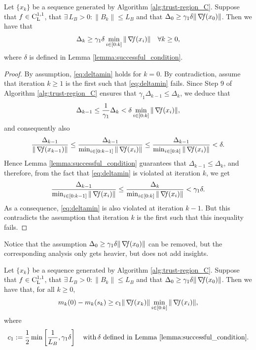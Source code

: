 \documentclass[10pt,a4paper]{article}
\begin{document}
\begin{lemma}\label{lemma:deltamin}
	Let $\{x_k\}$ be a sequence generated by Algorithm \ref{alg:trust-region_C}. Suppose that $f\in \mathord{\mathrm{C^{1,1}_{L}}}$, that $\exists\, L_B>0: \|B_k\| \leq L_B$ and that $\Delta_0\geq \gamma_1 \delta \|\operatorname*{\mathit{\nabla \!f}}(x_0)\|$. Then we have that
	\begin{equation}\label{eq:deltamin}
		\Delta_k \geq \gamma_1 \delta \min_{i \in [0:k]} \|\operatorname*{\mathit{\nabla \!f}}(x_i)\| \quad \forall k\geq 0,
	\end{equation}
	where $\delta$ is defined in Lemma \ref{lemma:successful_condition}.
\end{lemma}
\begin{proof}
By assumption, \eqref{eq:deltamin} holds for $k = 0$. By contradiction, assume that iteration $k \geq 1$ is the first such that \eqref{eq:deltamin} fails. Since Step 9 of Algorithm \ref{alg:trust-region_C} ensures that $\gamma_1 \Delta_{k-1} \leq \Delta_k$, we deduce that
\begin{equation*}
	\Delta_{k-1} \leq \frac{1}{\gamma_1}\Delta_k < \delta \min_{i \in [0:k]} \|\operatorname*{\mathit{\nabla \!f}}(x_i)\|,
\end{equation*}
and consequently also
\begin{equation*}
	\frac{\Delta_{k-1}}{\|\operatorname*{\mathit{\nabla \!f}}(x_{k-1})\|} \leq \frac{\Delta_{k-1}}{\min_{i \in [0:k-1]} \|\operatorname*{\mathit{\nabla \!f}}(x_i)\|} \leq \frac{\Delta_{k-1}}{\min_{i \in [0:k]} \|\operatorname*{\mathit{\nabla \!f}}(x_i)\|} < \delta.
\end{equation*}
Hence Lemma \ref{lemma:successful_condition} guarantees that $\Delta_{k-1} \leq \Delta_k$, and therefore, from the fact that \eqref{eq:deltamin} is violated at iteration $k$, we get
\begin{equation*}
	\frac{\Delta_{k-1}}{\min_{i \in [0:k-1]} \|\operatorname*{\mathit{\nabla \!f}}(x_i)\|} \leq \frac{\Delta_k}{\min_{i \in [0:k]} \|\operatorname*{\mathit{\nabla \!f}}(x_i)\|} < \gamma_1 \delta.
\end{equation*}
As a consequence, \eqref{eq:deltamin} is also violated at iteration $k - 1$. But this contradicts the assumption that iteration $k$ is the first such that this inequality fails. 
\end{proof}
\noindent Notice that the assumption $\Delta_0\geq \gamma_1 \delta \|\operatorname*{\mathit{\nabla \!f}}(x_0)\|$ can be removed, but the corresponding analysis only gets heavier, but does not add insights.

\begin{lemma}\label{lemma:model_decrease2}
	Let $\{x_k\}$ be a sequence generated by Algorithm \ref{alg:trust-region_C}. Suppose that $f\in \mathord{\mathrm{C^{1,1}_{L}}}$, that $\exists\, L_B>0: \|B_k\| \leq L_B$ and that $\Delta_0\geq \gamma_1 \delta \|\operatorname*{\mathit{\nabla \!f}}(x_0)\|$. Then we have that, for all $k \geq 0$,
	\begin{equation*}
		m_k(0) - m_k(s_k) \geq c_1 \|\operatorname*{\mathit{\nabla \!f}}(x_k)\| \min_{i \in [0:k]} \|\operatorname*{\mathit{\nabla \!f}}(x_i)\|,
	\end{equation*}
	where
	\begin{equation*}
		c_1 := \frac{1}{2} \min \left[ \frac{1}{L_B}, \gamma_1\delta \right] \quad \mathord{\mathrm{with }}\, \delta \text{ defined in Lemma \ref{lemma:successful_condition}}.
	\end{equation*}
\end{lemma}
\end{document}
